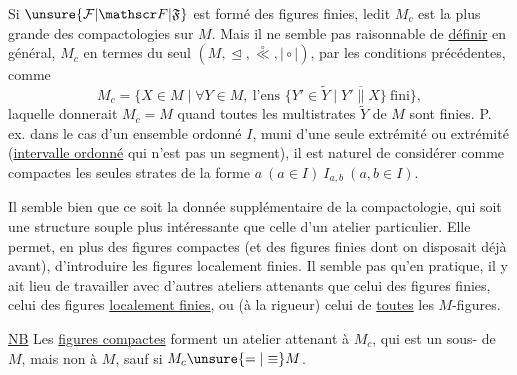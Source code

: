  Si $\unsure{\mathcal F|\mathscr F|\mathfrak F}$ est formé des figures finies, ledit $M_c$ est  la plus grande des compactologies sur $M$. Mais il ne semble pas raisonnable de \uline{définir} en général, $M_c$ en termes du seul  $(M,\trianglelefteq,\overset{\circ}{\ll},\mathrel{\mid\circ\mid})$, par les conditions précédentes, comme 
\[
M_c=\{X\in M\mid\forall Y\in M,\ \text{l'ens }\{Y'\in\widetilde Y\mid Y'\mathrel{\overline{\parallel}}X\}\ \text{fini}\},
\]
laquelle donnerait $M_c=M$ quand toutes les multistrates  $\widetilde Y$ de $M$ sont finies. P. ex. dans le cas d'un ensemble ordonné $I$, muni d'une seule extrémité ou  extrémité (\uline{intervalle ordonné} qui n'est pas un segment), il est naturel de considérer comme compactes les seules strates de la forme $a\ (a\in I)\ I_{a,b}\ (a,b\in I)$.

Il semble bien que ce soit la donnée supplémentaire de la compactologie, qui soit une structure souple plus intéressante que celle d'un atelier  particulier.
Elle permet, en plus des  figures compactes (et des figures finies dont on disposait déjà avant), d'introduire les figures localement finies. Il  semble pas qu'en pratique, il y ait lieu de travailler avec d'autres ateliers attenants que celui des figures finies, celui des figures \uline{localement finies}, ou (à la rigueur) celui de \uline{toutes} les $M$-figures.

\uline{NB} Les \uline{figures compactes} forment un atelier attenant à $M_c$, qui est un sous-\uline{} de $M$, mais non à $M$, sauf si $M_c\unsure{=|\equiv}M$.

